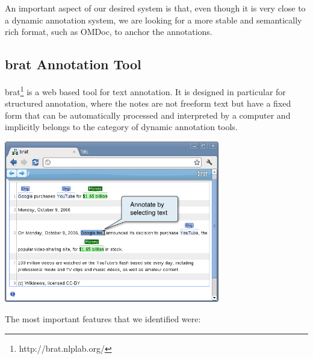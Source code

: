 \documentclass[a4paper, 12pt, notitlepage]{report}
\begin{document}
An important aspect of our desired system is that, even though it is very close to a dynamic annotation system, we are looking for a more stable and semantically rich format, such as OMDoc, to anchor the annotations.

\subsection{brat Annotation Tool} %
brat\footnote{http://brat.nlplab.org/} is a web based tool for text annotation. It is designed in particular for structured annotation, where the notes are not freeform text but have a fixed form that can 
be automatically processed and interpreted by a computer and implicitly belongs to the category of dynamic annotation tools.
\begin{center}
 \includegraphics[width=3.7in]{brat.png}
\end{center}
The most important features that we identified were:
\end{document}
